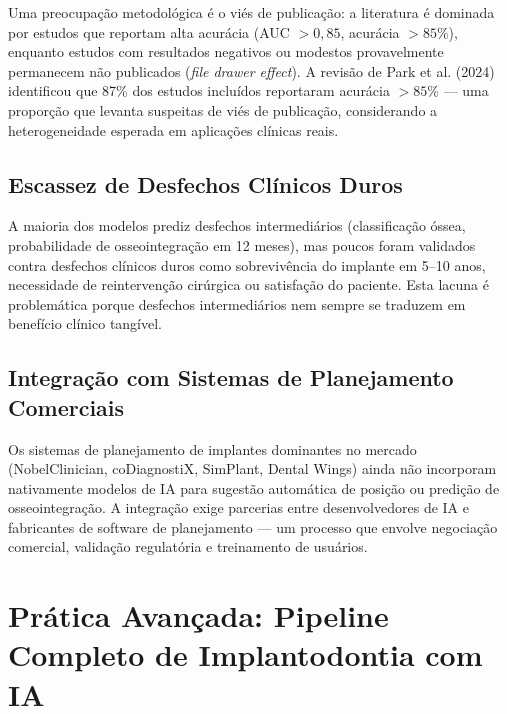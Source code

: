 Uma preocupação metodológica é o viés de publicação: a literatura é dominada por estudos que reportam alta acurácia (AUC $>0,85$, acurácia $>85\%$), enquanto estudos com resultados negativos ou modestos provavelmente permanecem não publicados (\textit{file drawer effect}). A revisão de Park et al. (2024) identificou que 87\% dos estudos incluídos reportaram acurácia $>85\%$ --- uma proporção que levanta suspeitas de viés de publicação, considerando a heterogeneidade esperada em aplicações clínicas reais.

\subsection{Escassez de Desfechos Clínicos Duros}

A maioria dos modelos prediz desfechos intermediários (classificação óssea, probabilidade de osseointegração em 12 meses), mas poucos foram validados contra desfechos clínicos duros como sobrevivência do implante em 5--10 anos, necessidade de reintervenção cirúrgica ou satisfação do paciente. Esta lacuna é problemática porque desfechos intermediários nem sempre se traduzem em benefício clínico tangível.


\subsection{Integração com Sistemas de Planejamento Comerciais}

Os sistemas de planejamento de implantes dominantes no mercado (NobelClinician, coDiagnostiX, SimPlant, Dental Wings) ainda não incorporam nativamente modelos de IA para sugestão automática de posição ou predição de osseointegração. A integração exige parcerias entre desenvolvedores de IA e fabricantes de software de planejamento --- um processo que envolve negociação comercial, validação regulatória e treinamento de usuários.

\section{Prática Avançada: Pipeline Completo de Implantodontia com IA}

